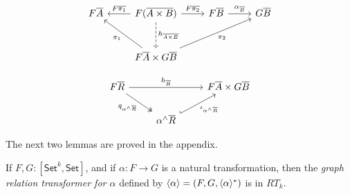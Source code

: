 \documentclass[runningheads]{llncs}
\newcommand{\set}{\mathsf{Set}}
\begin{document}
\begin{figure*}[ht]
\vspace*{-0.3in}
  \begin{minipage}[b]{0.25\linewidth}
{\footnotesize\[\begin{tikzcd}[row sep = large]
        F\overline{A}
        &F(\overline{A \times B})
        \ar[l, "{F\overline{\pi_1}}"']
        \ar[r, "{F\overline{\pi_2}}"]
        \ar[d, dashed, "{h_{\overline{A \times B}}}"]
        &F\overline{B}
        \ar[r, "{\alpha_{\ol{B}}}"]
        &G\overline{B} \\
        &F\overline{A} \times G\overline{B}
        \ar[ul, "{\pi_1}"] \ar[urr, "{\pi_2}"']
\end{tikzcd}\]}
  \end{minipage}
  \hspace*{1.4in}
  \begin{minipage}[b]{0.5\linewidth}
{\footnotesize\[\begin{tikzcd}
        F\overline{R}
        \ar[rr, "{h_{\overline{R}}}"]
        \ar[dr, twoheadrightarrow, "{q_{\alpha^\wedge\overline{R}}}"']
        &&F\overline{A} \times G\overline{B} \\
        &\alpha^\wedge\overline{R}
        \ar[ur, hookrightarrow, "{\iota_{\alpha^\wedge\overline{R}}}"']
\end{tikzcd}\]}
\end{minipage}\vspace*{-0.3in}
\end{figure*}


{\color{red} The next two lemmas are proved in the appendix.}
\begin{lemma}\label{lem:graph-reln-functors}
If $F,G : [\set^k,\set]$, and if $\alpha : F \to G$ is a natural
transformation, then the {\em graph relation transformer for $\alpha$}
defined by $\langle {\alpha} \rangle = (F, G, \langle {\alpha} \rangle^*)$ is in $RT_k$.
\end{lemma}
\end{document}
